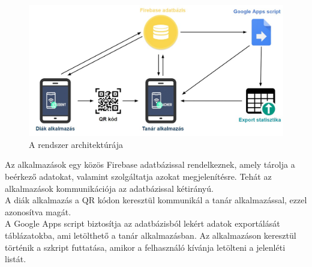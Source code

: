 \documentclass[12pt]{article}
\numberwithin{figure}{section}
\numberwithin{equation}{section}
\begin{document}
\begin{figure}[H]
	\includegraphics[width=\textwidth]{architecture2.jpg}
	\caption{A rendszer architektúrája}
\end{figure}

\hfill \break
Az alkalmazások egy közös Firebase adatbázissal rendelkeznek, amely tárolja a beérkező adatokat, valamint szolgáltatja azokat megjelenítésre. Tehát az alkalmazások kommunikációja az adatbázissal kétirányú.\\
A diák alkalmazás a QR kódon keresztül kommunikál a tanár alkalmazással, ezzel azonosítva magát.\\
A Google Apps script biztosítja az adatbázisból lekért adatok exportálását táblázatokba, ami letölthető a tanár alkalmazásban. Az alkalmazáson keresztül történik a szkript futtatása, amikor a felhasználó kívánja letölteni a jelenléti listát.\\

\hfill\break
\end{document}
